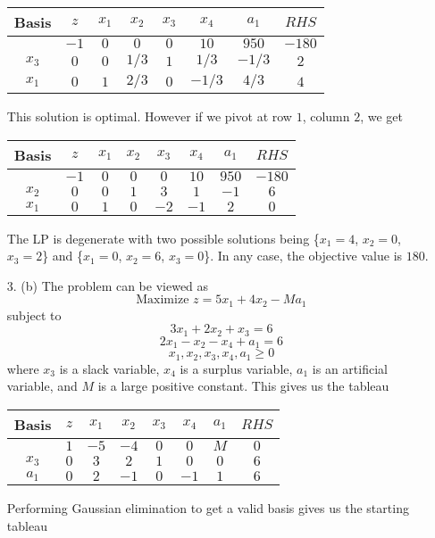 \documentclass{article}[12pt,a4paper]
\begin{document}
\begin{enumerate}
\begin{center}
  \begin{tabular}{c | c | c c c c c | c}
  Basis & $z$ & $x_1$ & $x_2$ & $x_3$ & $x_4$ & $a_1$ & $RHS$ \\ \hline
           & $-1$ & $0$ & $0$ & $0$ & $10$ & $950$ & $-180$ \\ \hline
  $x_3$ & $0$ & $0$ & $1/3$ & $1$ & $1/3$ & $-1/3$ & $2$ \\
  $x_1$ & $0$ & $1$ & $2/3$ & $0$ & $-1/3$ & $4/3$ & $4$
  \end{tabular}
  \end{center}
  This solution is optimal. However if we pivot at row $1$, column $2$, we get
  \begin{center}
  \begin{tabular}{c | c | c c c c c | c}
  Basis & $z$ & $x_1$ & $x_2$ & $x_3$ & $x_4$ & $a_1$ & $RHS$ \\ \hline
           & $-1$ & $0$ & $0$ & $0$ & $10$ & $950$ & $-180$ \\ \hline
  $x_2$ & $0$ & $0$ & $1$ & $3$ & $1$ & $-1$ & $6$ \\
  $x_1$ & $0$ & $1$ & $0$ & $-2$ & $-1$ & $2$ & $0$
  \end{tabular}
  \end{center}
  The LP is degenerate with two possible solutions being \{$x_1 = 4$, $x_2 = 0$, $x_3 = 2$\} and \linebreak
  \{$x_1 = 0$, $x_2 = 6$, $x_3 = 0$\}. In any case, the objective value is $180$.
  \pagebreak
  \item[3.] (b) The problem can be viewed as
  $$\mbox{Maximize } z = 5x_1 + 4x_2 - Ma_1$$
  subject to
  $$3x_1 + 2x_2 + x_3 = 6$$
  $$2x_1 - x_2 - x_4 + a_1 = 6$$
  $$x_1, x_2, x_3, x_4, a_1 \ge 0$$
  where $x_3$ is a slack variable, $x_4$ is a surplus variable, $a_1$ is an artificial variable, and 
  $M$ is a large positive constant. This gives us the tableau
  \begin{center}
  \begin{tabular}{c | c | c c c c c | c}
  Basis & $z$ & $x_1$ & $x_2$ & $x_3$ & $x_4$ & $a_1$ & $RHS$ \\ \hline
           & $1$ & $-5$ & $-4$ & $0$ & $0$ & $M$ & $0$ \\ \hline
  $x_3$ & $0$ & $3$ & $2$ & $1$ & $0$ & $0$ & $6$ \\
  $a_1$ & $0$ & $2$ & $-1$ & $0$ & $-1$ & $1$ & $6$
  \end{tabular}
  \end{center}
  Performing Gaussian elimination to get a valid basis gives us the starting tableau

\end{enumerate}
\end{document}
